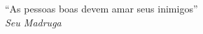 \begin{titlepage}
 \vspace*{5cm}
 \begin{flushright}
  ``As pessoas boas devem amar seus inimigos''\\\textit{Seu Madruga}
  \vspace{1cm}
 \end{flushright}
\end{titlepage}

